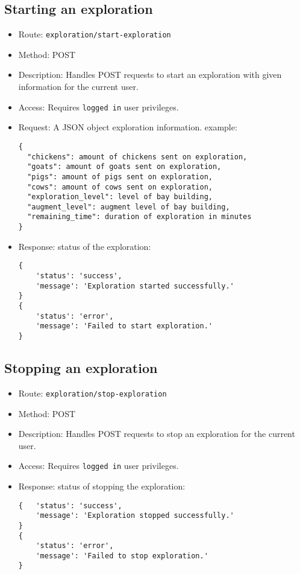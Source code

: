 \documentclass[12pt]{article}
\begin{document}
\subsection{Starting an exploration}
\begin{itemize}
    \item Route: \texttt{exploration/start-exploration}
    \item Method: POST
    \item {Description:} Handles POST requests to start an exploration with given information for the current user.
    \item {Access:} Requires \texttt{logged in} user privileges.
    \item {Request:} A JSON object exploration information. example:
    \begin{verbatim}
{
  "chickens": amount of chickens sent on exploration,
  "goats": amount of goats sent on exploration,
  "pigs": amount of pigs sent on exploration,
  "cows": amount of cows sent on exploration,
  "exploration_level": level of bay building,
  "augment_level": augment level of bay building,
  "remaining_time": duration of exploration in minutes
}
    \end{verbatim}
    \item {Response:} status of the exploration:
    \begin{verbatim}
{
    'status': 'success',
    'message': 'Exploration started successfully.'
}
{
    'status': 'error',
    'message': 'Failed to start exploration.'
}
    \end{verbatim}
\end{itemize}

\subsection{Stopping an exploration}
\begin{itemize}
    \item Route: \texttt{exploration/stop-exploration}
    \item Method: POST
    \item {Description:} Handles POST requests to stop an exploration for the current user.
    \item {Access:} Requires \texttt{logged in} user privileges.
    \item {Response:} status of stopping the exploration:
    \begin{verbatim}
{   'status': 'success',
    'message': 'Exploration stopped successfully.'
}
{
    'status': 'error',
    'message': 'Failed to stop exploration.'
}
    \end{verbatim}
\end{itemize}
\end{document}
